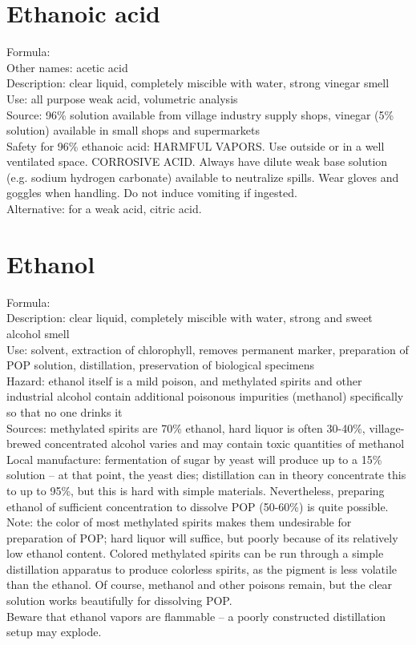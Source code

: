 \section{Ethanoic acid}
\label{sec:ethanoic}
Formula: \\
Other names: acetic acid\\
Description: clear liquid, 
completely miscible with water, 
strong vinegar smell\\
Use: all purpose weak acid, 
volumetric analysis\\
Source: 96\% solution available from village industry supply shops, 
vinegar (5\% solution) available in small shops and supermarkets\\
Safety for 96\% ethanoic acid: HARMFUL VAPORS. 
Use outside or in a well ventilated space. 
CORROSIVE ACID. 
Always have dilute weak base solution (e.g. 
sodium hydrogen carbonate) available to neutralize spills. 
Wear gloves and goggles when handling. 
Do not induce vomiting if ingested.\\
Alternative: for a weak acid, 
citric acid. 

\section{Ethanol}
\label{sec:}
Formula: \\
Description: clear liquid, 
completely miscible with water, 
strong and sweet alcohol smell\\
Use: solvent, 
extraction of chlorophyll, 
removes permanent marker, 
preparation of POP solution, 
distillation, 
preservation of biological specimens\\
Hazard: ethanol itself is a mild poison, 
and methylated spirits and other industrial alcohol contain 
additional poisonous impurities (methanol) 
specifically so that no one drinks it\\
Sources: methylated spirits are 70\% ethanol, 
hard liquor is often 30-40\%, 
village-brewed concentrated alcohol varies 
and may contain toxic quantities of methanol\\
Local manufacture: fermentation of sugar by yeast will produce 
up to a 15\% solution -- at that point, 
the yeast dies; 
distillation can in theory concentrate this to up to 95\%, 
but this is hard with simple materials. 
Nevertheless, 
preparing ethanol of sufficient concentration to dissolve POP (50-60\%) 
is quite possible.\\
Note: the color of most methylated spirits makes them undesirable 
for preparation of POP; 
hard liquor will suffice, 
but poorly because of its relatively low ethanol content. 
Colored methylated spirits can be run 
through a simple distillation apparatus to produce colorless spirits, 
as the pigment is less volatile than the ethanol. 
Of course, 
methanol and other poisons remain, 
but the clear solution works beautifully for dissolving POP.\\ 
Beware that ethanol vapors are flammable -- 
a poorly constructed distillation setup may explode.

